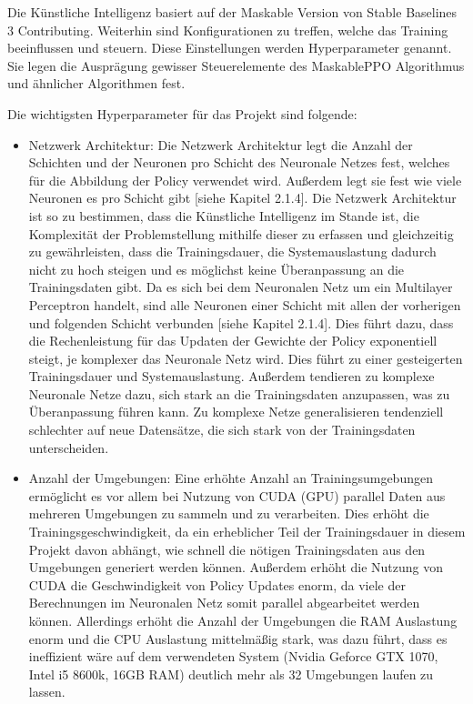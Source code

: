 Die Künstliche Intelligenz basiert auf der Maskable Version von Stable Baselines 3 Contributing. Weiterhin sind Konfigurationen zu treffen, welche das Training beeinflussen und steuern. Diese Einstellungen werden Hyperparameter genannt. Sie legen die Ausprägung gewisser Steuerelemente des MaskablePPO Algorithmus und ähnlicher Algorithmen fest.

Die wichtigsten Hyperparameter für das Projekt sind folgende:

\begin{itemize} 
\item Netzwerk Architektur: Die Netzwerk Architektur legt die Anzahl der Schichten und der Neuronen pro Schicht des Neuronale Netzes fest, welches für die Abbildung der Policy verwendet wird. Außerdem legt sie fest wie viele Neuronen es pro Schicht gibt [siehe Kapitel 2.1.4]. Die Netzwerk Architektur ist so zu bestimmen, dass die Künstliche Intelligenz im Stande ist, die Komplexität der Problemstellung mithilfe dieser zu erfassen und gleichzeitig zu gewährleisten, dass die Trainingsdauer, die Systemauslastung dadurch nicht zu hoch steigen und es möglichst keine Überanpassung an die Trainingsdaten gibt. Da es sich bei dem Neuronalen Netz um ein Multilayer Perceptron handelt, sind alle Neuronen einer Schicht mit allen der vorherigen und folgenden Schicht verbunden [siehe Kapitel 2.1.4]. Dies führt dazu, dass die Rechenleistung für das Updaten der Gewichte der Policy exponentiell steigt, je komplexer das Neuronale Netz wird. Dies führt zu einer gesteigerten Trainingsdauer und Systemauslastung. Außerdem tendieren zu komplexe Neuronale Netze dazu, sich stark an die Trainingsdaten anzupassen, was zu Überanpassung führen kann. Zu komplexe Netze generalisieren tendenziell schlechter auf neue Datensätze, die sich stark von der Trainingsdaten unterscheiden.

\item Anzahl der Umgebungen: Eine erhöhte Anzahl an Trainingsumgebungen ermöglicht es vor allem bei Nutzung von CUDA (GPU) parallel Daten aus mehreren Umgebungen zu sammeln und zu verarbeiten. Dies erhöht die Trainingsgeschwindigkeit, da ein erheblicher Teil der Trainingsdauer in diesem Projekt davon abhängt, wie schnell die nötigen Trainingsdaten aus den Umgebungen generiert werden können. Außerdem erhöht die Nutzung von CUDA die Geschwindigkeit von Policy Updates enorm, da viele der Berechnungen im Neuronalen Netz somit parallel abgearbeitet werden können. Allerdings erhöht die Anzahl der Umgebungen die RAM Auslastung enorm und die CPU Auslastung mittelmäßig stark, was dazu führt, dass es ineffizient wäre auf dem verwendeten System (Nvidia Geforce GTX 1070, Intel i5 8600k, 16GB RAM) deutlich mehr als 32 Umgebungen laufen zu lassen.


\end{itemize}
